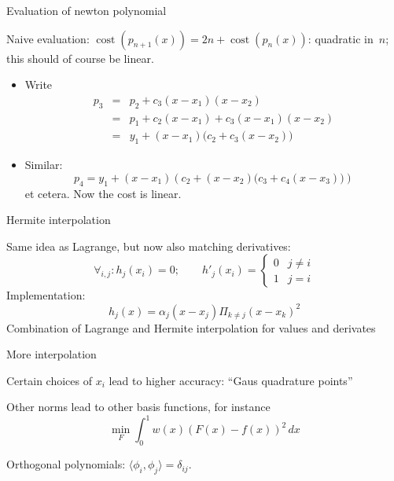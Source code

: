  {Evaluation of newton polynomial}

Naive evaluation:
  $\mathop{\mathrm{cost}}(p_{n+1}(x))=2n+\mathop{\mathrm{cost}}(p_n(x))$:
  quadratic in~$n$; this should of course be linear.
\begin{itemize}
\item Write
\begin{eqnarray*}p_3&=&p_2+c_3(x-x_1)(x-x_2)\\
&=&p_1+c_2(x-x_1)+c_3(x-x_1)(x-x_2)\\
&=&y_1+(x-x_1)\bigl(c_2+c_3(x-x_2)\bigr)
\end{eqnarray*}
\item Similar:
\[ p_4=y_1+(x-x_1)\left(c_2+(x-x_2)\bigl(c_3+c_4(x-x_3)\bigr)\right)\]
et cetera. Now the cost is linear.
\end{itemize}


 {Hermite interpolation}

  Same idea as Lagrange, but now also matching derivatives:
  \[ \forall_{i,j}\colon h_j(x_i)=0; \qquad
  h'_j(x_i)=
  \begin{cases}
    0&j\not=i\\ 1&j=i
  \end{cases}
  \]
  Implementation: \[ h_j(x)=\alpha_j(x-x_j)\Pi_{k\not=j}(x-x_k)^2 \]
  Combination of Lagrange and Hermite interpolation for values and derivates


 {More interpolation}

  Certain choices of $x_i$ lead to higher accuracy: ``Gaus quadrature points''

  Other norms lead to other basis functions, for instance
  \[ \min_F \int_0^1 w(x)(F(x)-f(x))^2\,dx \]

  Orthogonal polynomials: $\langle \phi_i,\phi_j\rangle=\delta_{ij}$.

